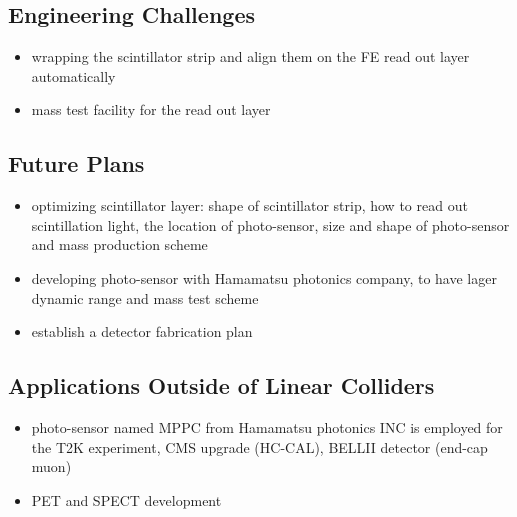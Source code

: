 \subsection{Engineering Challenges}
\begin{itemize}
	\item wrapping the scintillator strip and align them on the FE read out layer automatically
	\item mass test facility for the read out layer
\end{itemize}

\subsection{Future Plans}
\begin{itemize}
	\item optimizing scintillator layer: shape of scintillator strip, how to read out scintillation light, the location of  photo-sensor, size and shape of photo-sensor and mass production scheme
	\item developing photo-sensor with Hamamatsu photonics company, to have lager dynamic range and mass test scheme
	\item establish a detector fabrication plan
\end{itemize}

\subsection{Applications Outside of Linear Colliders}
\begin{itemize}
	\item photo-sensor named MPPC from Hamamatsu photonics INC is employed for the T2K experiment, CMS upgrade (HC-CAL), BELLII detector (end-cap muon)
	\item PET and SPECT development
\end{itemize}
